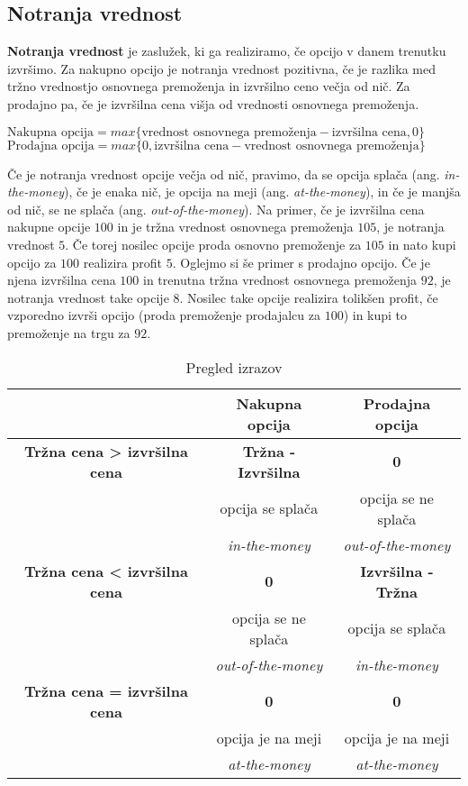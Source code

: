 \documentclass[a4paper]{article}
\begin{document}
\subsection{Notranja vrednost}
\textbf{Notranja vrednost} je zaslužek, ki ga realiziramo, če opcijo v danem trenutku izvršimo.
Za nakupno opcijo je notranja vrednost pozitivna, če je razlika med tržno vrednostjo osnovnega premoženja in 
izvršilno ceno večja od nič. Za prodajno pa, če je izvršilna cena višja od vrednosti osnovnega premoženja.
\begin{center}
    $\text{Nakupna opcija} = max\{\text{vrednost osnovnega premoženja} - \text{izvršilna cena}, 0\}$ \\
    $\text{Prodajna opcija} = max\{0, \text{izvršilna cena} - \text{vrednost osnovnega premoženja}\}$
\end{center}
Če je notranja vrednost opcije večja od nič, pravimo, da se opcija splača (ang. \textit{in-the-money}), če je enaka nič, je opcija na meji (ang. \textit{at-the-money}),
in če je manjša od nič, se ne splača (ang. \textit{out-of-the-money}).
Na primer, če je izvršilna cena nakupne opcije \textdollar$100$ in je tržna vrednost osnovnega premoženja \textdollar$105$, je notranja vrednost \textdollar$5$. 
Če torej nosilec opcije proda osnovno premoženje za \textdollar$105$ in nato kupi opcijo za \textdollar$100$ realizira profit \textdollar$5$.
Oglejmo si še primer s prodajno opcijo. Če je njena izvršilna cena \textdollar$100$ in trenutna tržna vrednost osnovnega premoženja \textdollar$92$, je notranja 
vrednost take opcije \textdollar$8$. Nosilec take opcije realizira tolikšen profit, če vzporedno izvrši opcijo (proda premoženje prodajalcu za \textdollar$100$) in
kupi to premoženje na trgu za \textdollar$92$.

\begin{table}[h]
    \centering
    \begin{tabular} { c | c | c }
        \toprule
        & Nakupna opcija & Prodajna opcija \\
        \hline
        \textbf{Tržna cena > izvršilna cena} & \textbf{Tržna - Izvršilna} & \textbf{0}  \\
        \hline
        & opcija se splača & opcija se ne splača \\ 
        & \textit{in-the-money} & \textit{out-of-the-money} \\
        \hline
        \textbf{Tržna cena < izvršilna cena} &\textbf{0} & \textbf{Izvršilna - Tržna} \\
        \hline
        & opcija se ne splača & opcija se splača \\
        & \textit{out-of-the-money} &\textit{in-the-money}\\ 
        \hline
        \textbf{Tržna cena = izvršilna cena} & \textbf{0} & \textbf{0} \\
        \hline
        & opcija je na meji & opcija je na meji \\
        & \textit{at-the-money} &  \textit{at-the-money} \\  
        \bottomrule
    \end{tabular}
    \caption{Pregled izrazov}
\end{table}
\end{document}
